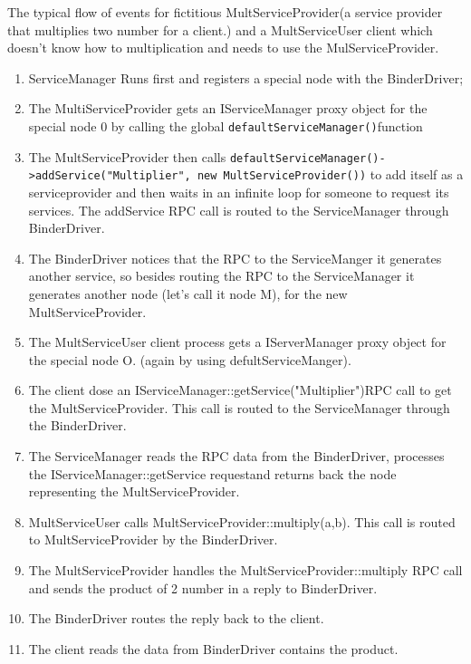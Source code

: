 \documentclass[11pt, a4paper]{book}
\begin{document}
The typical flow of events for fictitious MultServiceProvider(a service provider
that multiplies two number for a client.) and a MultServiceUser client which
doesn't know how to multiplication and needs to use the MulServiceProvider.
\begin{enumerate}
    \item ServiceManager Runs first and registers a special node with the 
        BinderDriver;
    \item The MultiServiceProvider gets an IServiceManager proxy object for the special node 0 by calling the global 
        \verb|defaultServiceManager()|function 
    \item The MultServiceProvider then calls
        \verb|defaultServiceManager()->addService("Multiplier", new MultServiceProvider())|
        to add itself as a serviceprovider and then
        waits in an infinite loop for someone to request its services. The
        addService RPC call is routed to the ServiceManager through 
        BinderDriver.
    \item The BinderDriver notices that the RPC to the ServiceManger it
    generates another service, so besides routing the RPC to the ServiceManager
    it generates another node (let's call it node M), for the new
    MultServiceProvider.
    \item The MultServiceUser client process gets a IServerManager proxy object
    for the special node O. (again by using defultServiceManger).
    \item The client dose an IServiceManager::getService("Multiplier")RPC call
    to get the MultServiceProvider. This call is routed to the ServiceManager
    through the BinderDriver.
    \item The ServiceManager reads the RPC data from the BinderDriver, processes
    the IServiceManager::getService requestand returns back the node
    representing the MultServiceProvider.
    \item MultServiceUser calls MultServiceProvider::multiply(a,b). This call is
    routed to MultServiceProvider by the BinderDriver.
    \item The MultServiceProvider handles the MultServiceProvider::multiply RPC
    call and sends the product of 2 number in a reply to BinderDriver.
    \item The BinderDriver routes the reply back to the client.
    \item The client reads the data from BinderDriver contains the product.
\end{enumerate}
\end{document}
